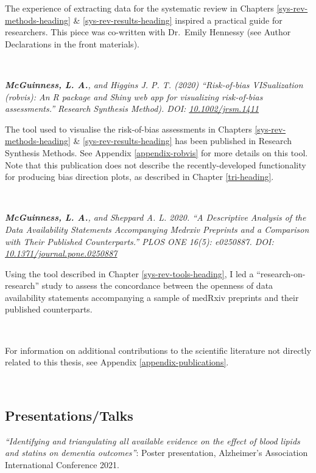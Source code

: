 \documentclass[a4paper, twoside]{templates/ociamthesis}
\begin{document}
The experience of extracting data for the systematic review in Chapters \ref{sys-rev-methods-heading} \& \ref{sys-rev-results-heading} inspired a practical guide for researchers. This piece was co-written with Dr.~Emily Hennessy (see Author Declarations in the front materials).

~

\emph{\textbf{McGuinness, L. A.}, and Higgins J. P. T. (2020) ``Risk‐of‐bias VISualization (robvis): An R package and Shiny web app for visualizing risk‐of‐bias assessments.'' Research Synthesis Method). DOI: \href{https://doi.org/10.1002/jrsm.1411}{10.1002/jrsm.1411}}

The tool used to visualise the risk-of-bias assessments in Chapters \ref{sys-rev-methods-heading} \& \ref{sys-rev-results-heading} has been published in Research Synthesis Methods. See Appendix \ref{appendix-robvis} for more details on this tool. Note that this publication does not describe the recently-developed functionality for producing bias direction plots, as described in Chapter \ref{tri-heading}.

~

\emph{\textbf{McGuinness, L. A.}, and Sheppard A. L. 2020. ``A Descriptive Analysis of the Data Availability Statements Accompanying Medrxiv Preprints and a Comparison with Their Published Counterparts.'' PLOS ONE 16(5): e0250887. DOI: \href{https://doi.org/10.1371/journal.pone.0250887}{10.1371/journal.pone.0250887}}

Using the tool described in Chapter \ref{sys-rev-tools-heading}, I led a ``research-on-research'' study to assess the concordance between the openness of data availability statements accompanying a sample of medRxiv preprints and their published counterparts.

~

For information on additional contributions to the scientific literature not directly related to this thesis, see Appendix \ref{appendix-publications}.

~

\hypertarget{presentationstalks}{%
\subsection{Presentations/Talks}\label{presentationstalks}}

\emph{``Identifying and triangulating all available evidence on the effect of blood lipids and statins on dementia outcomes''}: Poster presentation, Alzheimer's Association International Conference 2021.
\end{document}
